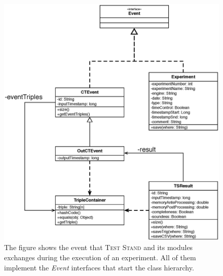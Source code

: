 \begin{figure}[h!tb]
  \centering
	\includegraphics[width=\linewidth]{images/uml_events}
	\caption[\name Execution Events - UML Schema]{The figure shows the event that \name \textsc{Test Stand} and its modules 	exchanges during the execution of an experiment. All of them implement the \textit{Event} interfaces that start the class 	hierarchy.} 
	\label{fig:uml_events}
\end{figure}

